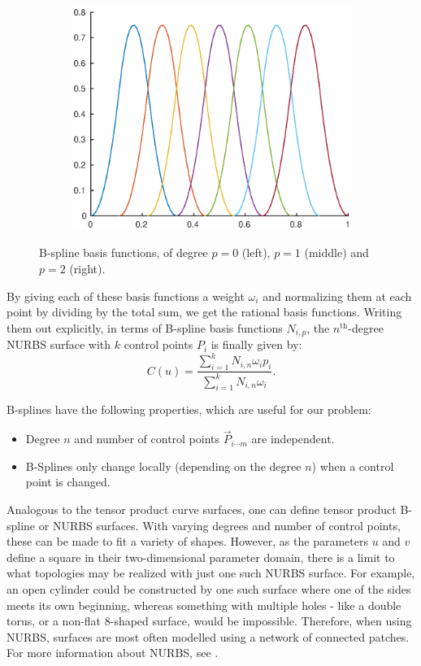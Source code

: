 \begin{figure}
\begin{subfigure}[b]{.3\linewidth}
  \includegraphics[width=\linewidth]{Pictures/basisquadratic}
  \label{fig:lognorm_quadratic}
\end{subfigure}
\caption{B-spline basis functions, of degree $p=0$ (left), $p=1$ (middle) and $p=2$ (right).}
\label{fig:bsplineBases}
\end{figure}


By giving each of these basis functions a weight $\omega_i$ and normalizing them at each point by dividing by the total sum, we get the rational basis functions. Writing them out explicitly, in terms of B-spline basis functions $N_{i,p}$, the $n^{\text{th}}$-degree NURBS surface with $k$ control points $P_i$ is finally given by:
\begin{equation}
C(u) = \frac{\sum_{i=1}^{k}N_{i,n}\omega_{i}p_{i}}{\sum_{i=1}^{k}N_{i,n}\omega_{i}}.
\end{equation}

B-splines have the following properties, which are useful for our problem:
\begin{itemize}
\item Degree $n$ and number of control points $\vec{P}_{i\cdots m}$ are independent.
\item B-Splines only change locally (depending on the degree $n$) when a control point is changed.
\end{itemize}

Analogous to the tensor product \Bez curve surfaces, one can define tensor product B-spline or NURBS surfaces. With varying degrees and number of control points, these can be made to fit a variety of shapes. However, as the parameters $u$ and $v$ define a square in their two-dimensional parameter domain, there is a limit to what topologies may be realized with just one such NURBS surface. For example, an open cylinder could be constructed by one such surface where one of the sides meets its own beginning, whereas something with multiple holes - like a double torus, or a non-flat 8-shaped surface, would be impossible. Therefore, when using NURBS, surfaces are most often modelled using a network of connected patches.  For more information about NURBS, see \cite{farin1999nurbs}.
